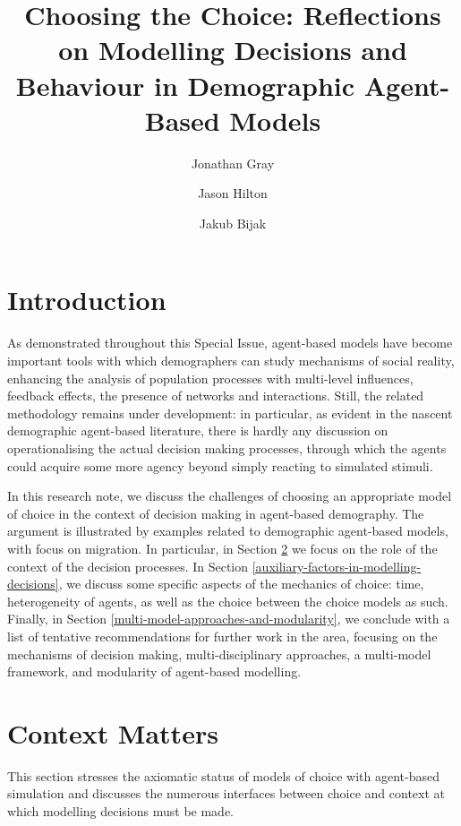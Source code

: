 \documentclass{article}
\begin{document}
\title{Choosing the Choice: Reflections on Modelling Decisions and Behaviour in Demographic Agent-Based Models}
\author{Jonathan Gray \and Jason Hilton \and Jakub Bijak}

\maketitle

\section{Introduction}
\label{sec:intro}

As demonstrated throughout this Special Issue, agent-based models have become important tools with which demographers can study mechanisms of social reality, enhancing the analysis of population processes with multi-level influences, feedback effects, the presence of networks and interactions. Still, the related methodology remains under development: in particular, as evident in the nascent demographic agent-based literature, there is hardly any discussion on operationalising the actual decision making processes, through which the agents could acquire some more agency beyond simply reacting to simulated stimuli. 

In this research note, we discuss the challenges of choosing an appropriate model of choice in the context of decision making in agent-based demography. The argument is illustrated by examples related to demographic agent-based models, with focus on migration. In particular, in Section \ref{sec:context_matters} we focus on the role of the context of the decision processes. In Section \ref{auxiliary-factors-in-modelling-decisions}, we discuss some specific aspects of the mechanics of choice: time, heterogeneity of agents, as well as the choice between the choice models as such. Finally, in Section \ref{multi-model-approaches-and-modularity}, we conclude with a list of tentative recommendations for further work in the area, focusing on the mechanisms of decision making, multi-disciplinary approaches, a multi-model framework, and modularity of agent-based modelling.


\section{Context Matters}
\label{sec:context_matters}

This section stresses the axiomatic status of models
of choice with agent-based simulation and discusses the numerous
interfaces between choice and context at which modelling decisions must
be made. 
\end{document}
